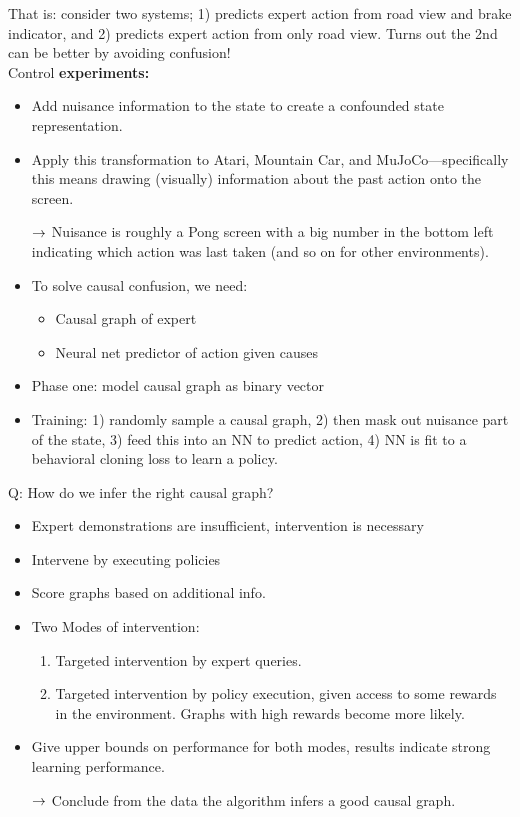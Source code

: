 That is: consider two systems; 1) predicts expert action from road view and brake indicator, and 2) predicts expert action from only road view. Turns out the 2nd can be better by avoiding confusion! \\

Control {\bf experiments:}
\begin{itemize}
    \item Add nuisance information to the state to create a confounded state representation.
    
    \item Apply this transformation to Atari, Mountain Car, and MuJoCo---specifically this means drawing (visually) information about the past action onto the screen.
    
    $\rightarrow$ Nuisance is roughly a Pong screen with a big number in the bottom left indicating which action was last taken (and so on for other environments).
    
    \item To solve causal confusion, we need:
    \begin{itemize}
        \item Causal graph of expert
        \item Neural net predictor of action given causes
    \end{itemize}
    \item Phase one: model causal graph as binary vector
    \item Training: 1) randomly sample a causal graph, 2) then mask out nuisance part of the state, 3) feed this into an NN to predict action, 4) NN is fit to a behavioral cloning loss to learn a policy.
\end{itemize}

Q: How do we infer the right causal graph?
\begin{itemize}
    \item Expert demonstrations are insufficient, intervention is necessary
    \item Intervene by executing policies
    \item Score graphs based on additional info.
    \item Two Modes of intervention:
    \begin{enumerate}
        \item Targeted intervention by expert queries.
        \item Targeted intervention by policy execution, given access to some rewards in the environment. Graphs with high rewards become more likely.
    \end{enumerate}
    \item Give upper bounds on performance for both modes, results indicate strong learning performance.
    
    $\rightarrow$ Conclude from the data the algorithm infers a good causal graph.
\end{itemize}

